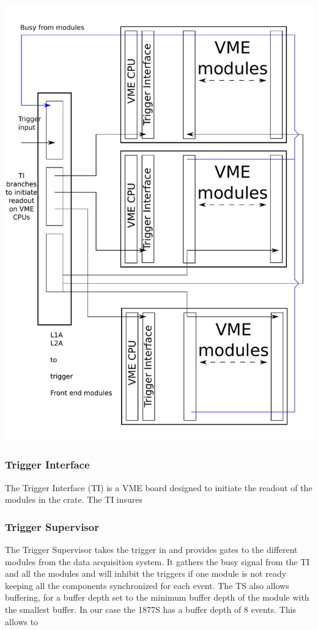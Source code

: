 \documentclass{article}
\begin{document}
\includegraphics[scale=0.55]{figs/TS.pdf}\\

\subsubsection{Trigger Interface}
The Trigger Interface (TI) is a VME board designed to initiate the readout of the modules in the crate. The TI insures 
\subsubsection{Trigger Supervisor}
The Trigger Supervisor takes the trigger in and provides gates to the different modules from the data acquisition system.
It gathers the busy signal from the TI and all the modules and will inhibit the triggers if one module is not ready keeping all the components synchronized for each event. The TS also allows buffering, for a buffer depth set to the minimum buffer depth of the module with the smallest buffer. In our case the 1877S has a buffer depth of 8 events. This allows to 
\end{document}
